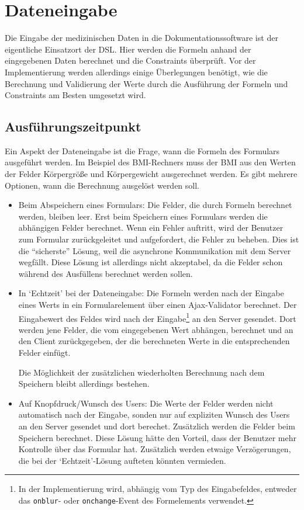 \section{Dateneingabe}
\label{implementierung_daten_eingabe}

Die Eingabe der medizinischen Daten in die Dokumentationssoftware ist der eigentliche Einsatzort der DSL. Hier werden die Formeln anhand der eingegebenen Daten berechnet und die Constraints überprüft. Vor der Implementierung werden allerdings einige Überlegungen benötigt, wie die Berechnung und Validierung der Werte durch die Aus\-führ\-ung der Formeln und Constraints am Besten umgesetzt wird.


\subsection{Aus\-führ\-ungszeitpunkt}

Ein Aspekt der Dateneingabe ist die Frage, wann die Formeln des Formulars ausgeführt werden. Im Beispiel des BMI-Rechners muss der BMI aus den Werten der Felder Kör\-per\-grö\-ße und Körpergewicht ausgerechnet werden. Es gibt mehrere Optionen, wann die Berechnung ausgelöst werden soll.

\begin{itemize}
	\item Beim Abspeichern eines Formulars: Die Felder, die durch Formeln berechnet werden, bleiben leer. Erst beim Speichern eines Formulars werden die abhängigen Felder berechnet. Wenn ein Fehler auftritt, wird der Benutzer zum Formular zurückgeleitet und aufgefordert, die Fehler zu beheben. Dies ist die ``sicherste'' Lösung, weil die asynchrone Kommunikation mit dem Server wegfällt. Diese Lösung ist allerdings nicht akzeptabel, da die Felder schon während des Ausfüllens berechnet werden sollen.

	\item In `Echtzeit' bei der Dateneingabe: Die Formeln werden nach der Eingabe eines Werts in ein Formularelement über einen Ajax-Validator berechnet. Der Eingabewert des Feldes wird nach der Eingabe\footnote{In der Implementierung wird, abhängig vom Typ des Eingabefeldes, entweder das \texttt{onblur}- oder \texttt{onchange}-Event des Formelements verwendet.} an den Server gesendet. Dort werden jene Felder, die vom eingegebenen Wert abhängen, berechnet und an den Client zurückgegeben, der die berechneten Werte in die ent\-sprech\-enden Felder einfügt.

	Die Möglichkeit der zusätzlichen wiederholten Berechnung nach dem Speichern bleibt allerdings bestehen.

	\item Auf Knopfdruck/Wunsch des Users: Die Werte der Felder werden nicht automatisch nach der Eingabe, sonden nur auf expliziten Wunsch des Users an den Server gesendet und dort berechet. Zu\-sätz\-lich werden die Felder beim Speichern berechnet. Diese Lösung hätte den Vorteil, dass der Benutzer mehr Kontrolle über das Formular hat. Zu\-sätz\-lich werden etwaige Verzögerungen, die bei der `Echtzeit'-Lösung aufteten könnten vermieden.
\end{itemize}

